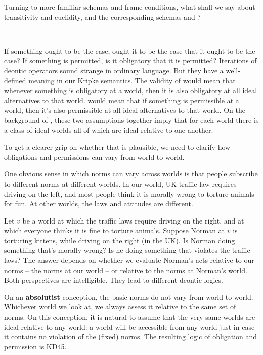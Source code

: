 
Turning to more familiar schemas and frame conditions, what shall we say about
transitivity and euclidity, and the corresponding schemas  and ?
%
\begin{principles}
\\
\end{principles}
%
If something ought to be the case, ought it to be the case that it ought to be
the case? If something is permitted, is it obligatory that it is permitted?
Iterations of deontic operators sound strange in ordinary language. But they
have a well-defined meaning in our Kripke semantics. The validity of 
would mean that whenever something is obligatory at a world, then it is also
obligatory at all ideal alternatives to that world.  would mean that if
something is permissible at a world, then it's also permissible at all ideal
alternatives to that world. On the background of , these two assumptions
together imply that for each world there is a class of ideal worlds all of which
are ideal relative to one another.

To get a clearer grip on whether that is plausible, we need to clarify how
obligations and permissions can vary from world to world.

One obvious sense in which norms can vary across worlds is that people subscribe
to different norms at different worlds. In our world, UK traffic law requires
driving on the left, and most people think it is morally wrong to torture animals
for fun. At other worlds, the laws and attitudes are different.

Let $v$ be a world at which the traffic laws require driving on the right, and
at which everyone thinks it is fine to torture animals. Suppose Norman at $v$ is
torturing kittens, while driving on the right (in the UK). Is Norman doing
something that's morally wrong? Is he doing something that violates the traffic
laws? The answer depends on whether we evaluate Norman's acts relative to our
norms -- the norms at our world -- or relative to the norms at Norman's world.
Both perspectives are intelligible. They lead to different deontic logics.

On an \textbf{absolutist} conception, the basic norms do not vary from world to world.
Whichever world we look at, we always assess it relative to the same set of
norms. On this conception, it is natural to assume that the very same worlds are
ideal relative to any world: a world will be accessible from any world just in
case it contains no violation of the (fixed) norms. The resulting logic of
obligation and permission is KD45.

